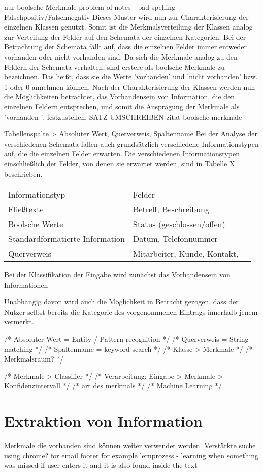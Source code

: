 nur boolsche Merkmale
problem of notes - bad spelling
Falschpositiv/Falschnegativ
Dieses Muster wird nun zur Charakterisierung der einzelnen Klassen genutzt. Somit ist die Merkmalsverteilung der Klassen analog zur Verteilung der Felder auf den Schemata der einzelnen Kategorien. 
Bei der Betrachtung der Schemata fällt auf, dass die einzelnen Felder immer entweder vorhanden oder nicht vorhanden sind. Da sich die Merkmale analog zu den Feldern der Schemata verhalten, sind erstere als boolsche Merkmale zu bezeichnen. Das heißt, dass sie die Werte 'vorhanden' und 'nicht vorhanden' bzw. 1 oder 0 annehmen können. Nach der Charakterisierung der Klassen werden nun die Möglichkeiten betrachtet, das Vorhandensein von Information, die den einzelnen Feldern entsprechen, und somit die Ausprägung der Merkmale als 'vorhanden ', festzustellen. 
SATZ UMSCHREIBEN
zitat boolsche merkmale

Tabellenspalte > Absoluter Wert, Querverweis, Spaltenname
Bei der Analyse der verschiedenen Schemata fallen auch grundsätzlich verschiedene Informationstypen auf, die die einzelnen Felder erwarten. Die verschiedenen Informationstypen einschließlich der Felder, von denen sie erwartet werden, sind in Tabelle X beschrieben.

\begin{tabular}{lll}
    Informationstyp                 & Felder \\
    Fließtexte                      & Betreff, Beschreibung \\
    Boolsche Werte                  & Status (geschlossen/offen) \\
    Standardformatierte Information & Datum, Telefonnummer \\
    Querverweis                     & Mitarbeiter, Kunde, Kontakt, \\
\end{tabular}

Bei der Klassifikation der Eingabe wird zunächst das Vorhandensein von Informationen

Unabhängig davon wird auch die Möglichkeit in Betracht gezogen, dass der Nutzer selbst bereits die Kategorie des vorgenommenen Eintrags innerhalb jenem vermerkt.



/* Absoluter Wert = Entity / Pattern recognition */
/* Querverweis = String matching */
/* Spaltenname = keyword search */
/* Klasse > Merkmale */
/* Merkmalsraum? */

/* Merkmale > Classifier */
/* Verarbeitung: Eingabe > Merkmale > Konfidenzintervall */
/* art des merkmals */ 
/* Machine Learning */

\section{Extraktion von Information}
Merkmale die vorhanden sind können weiter verwendet werden.
Verstärkte suche
using chrome? for email footer for example
lernprozess - learning when something was missed if user enters it and it is also found inside the text
